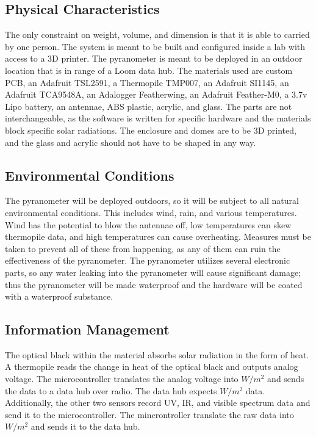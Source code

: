 \documentclass[10pt,draftclsnofoot,onecolumn,letterpaper]{article}
\begin{document}
\subsection{Physical Characteristics}
The only constraint on weight, volume, and dimension is that it is able to carried by one person. The system is meant to be built and configured inside a lab with access to a 3D printer. The pyranometer is meant to be deployed in an outdoor location that is in range of a Loom data hub. The materials used are custom PCB, an Adafruit TSL2591, a Thermopile TMP007, an Adafruit SI1145, an Adafruit TCA9548A, an Adalogger Featherwing, an Adafruit Feather-M0, a 3.7v Lipo battery, an antennae, ABS plastic, acrylic, and glass. The parts are not interchangeable, as the software is written for specific hardware and the materials block specific solar radiations. The enclosure and domes are to be 3D printed, and the glass and acrylic should not have to be shaped in any way.

\subsection{Environmental Conditions}
The pyranometer will be deployed outdoors, so it will be subject to all natural environmental conditions. This includes wind, rain, and various temperatures. Wind has the potential to blow the antennae off, low temperatures can skew thermopile data, and high temperatures can cause overheating. Measures must be taken to prevent all of these from happening, as any of them can ruin the effectiveness of the pyranometer. The pyranometer utilizes several electronic parts, so any water leaking into the pyranometer will cause significant damage; thus the pyranometer will be made waterproof and the hardware will be coated with a waterproof substance.

\subsection{Information Management}
The optical black within the material absorbs solar radiation in the form of heat. A thermopile reads the change in heat of the optical black and outputs analog voltage. The microcontroller translates the analog voltage into $W/m^2$ and sends the data to a data hub over radio. The data hub expects $W/m^2$ data. Additionally, the other two sensors record UV, IR, and visible spectrum data and send it to the microcontroller. The mincrontroller translate the raw data into $W/m^2$ and sends it to the data hub.
\end{document}
